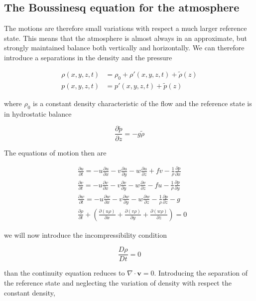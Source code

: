 \subsection{The Boussinesq equation for the
atmosphere}\label{the-boussinesq-equation-for-the-atmosphere}

The motions are therefore small variations with respect a much larger
reference state. This means that the atmosphere is almost always in an
approximate, but strongly maintained balance both vertically and
horizontally. We can therefore introduce a separations in the density
and the pressure

\[\begin{aligned}
\rho(x,y,z,t) &= \rho_0+ \rho'(x,y,z,t)+\tilde{\rho}(z)   \\
p(x,y,z,t) &=  p'(x,y,z,t)+\tilde{p}(z)
\end{aligned}\]

where \(\rho_0\) is a constant density characteristic of the flow and
the reference state is in hydrostatic balance

\[\frac{\partial \tilde{p}}{\partial z} = -g \tilde{\rho}\]

The equations of motion then are

{\[\begin{aligned}
&\frac{\partial u}{\partial t} = -u\frac{\partial u}{\partial x} -v\frac{\partial u}{\partial y} -w\frac{\partial u}{\partial z} +  f v -\frac{1}{\rho}\frac{\partial p}{\partial x}  \\ 
&\frac{\partial v}{\partial t} = -u\frac{\partial v}{\partial x} -v\frac{\partial v}{\partial y} -w\frac{\partial v}{\partial z} -  f u -\frac{1}{\rho}\frac{\partial p}{\partial y}  \\
&\frac{\partial w}{\partial t} = -u\frac{\partial w}{\partial x} -v\frac{\partial w}{\partial y} -w\frac{\partial w}{\partial z} -\frac{1}{\rho}\frac{\partial p}{\partial z} -g\\
&\frac{\partial \rho}{\partial t} + \left(\frac{\partial (u\rho)}{\partial x} +\frac{\partial (v\rho)}{\partial y} +\frac{\partial (w\rho)}{\partial z}\right) = 0
\end{aligned}\]}

we will now introduce the incompressibility condition

\[\frac{D \rho}{Dt} = 0\]

than the continuity equation reduces to \(\nabla\cdot\mathbf{v}= 0\).
Introducing the separation of the reference state and neglecting the
variation of density with respect the constant density,

